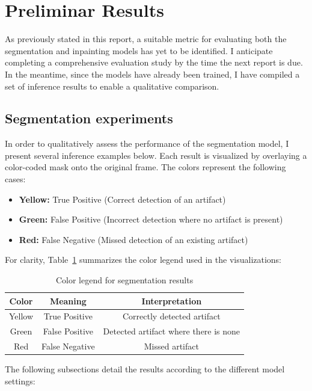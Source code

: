 \documentclass[openany, 12pt]{article}
\begin{document}
	
	\section{Preliminar Results}
	As previously stated in this report, a suitable metric for evaluating both the segmentation and inpainting models has yet to be identified. I anticipate completing a comprehensive evaluation study by the time the next report is due. In the meantime, since the models have already been trained, I have compiled a set of inference results to enable a qualitative comparison. 
	\subsection{Segmentation experiments}
	In order to qualitatively assess the performance of the segmentation model, I present several inference examples below. Each result is visualized by overlaying a color-coded mask onto the original frame. The colors represent the following cases:
	
	\begin{itemize} \item \textbf{Yellow:} True Positive (Correct detection of an artifact) \item \textbf{Green:} False Positive (Incorrect detection where no artifact is present) \item \textbf{Red:} False Negative (Missed detection of an existing artifact) \end{itemize}
	
	For clarity, Table~\ref{tab:legend} summarizes the color legend used in the visualizations:
	
\begin{table}[h]
	\centering
	\begin{tabular}{|c|c|c|}
		\hline
		\textbf{Color} & \textbf{Meaning} & \textbf{Interpretation} \\
		\hline
		\textcolor{groc}{Yellow} & True Positive & Correctly detected artifact \\
		\hline
		\textcolor{verd}{Green} & False Positive & Detected artifact where there is none \\
		\hline
		\textcolor{vermell}{Red} & False Negative & Missed artifact \\
		\hline
	\end{tabular}
	\caption{Color legend for segmentation results}
	\label{tab:legend}
\end{table}
The following subsections detail the results according to the different model settings:
\end{document}
